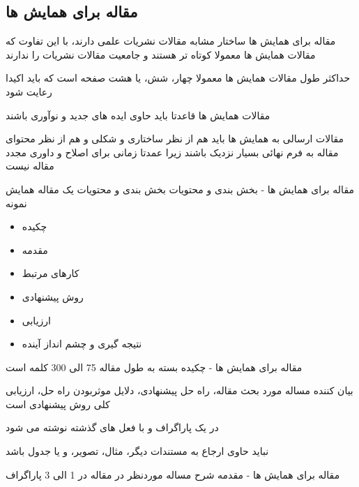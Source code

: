 \documentclass[14pt]{beamer}
\makeatletter
\newcommand{\rtlist}{\raggedleft\rightskip\@totalleftmargin}
\newcommand{\sectionfontsize}{\fontsize{22pt}{0pt}\selectfont}
\newcommand{\framefontsizelarge}{\fontsize{18pt}{0pt}\selectfont}
\newcommand{\frametitlefontsize}{\fontsize{20pt}{0pt}\selectfont}
\makeatother
\begin{document}
\begin{persian}
	\section{\sectionfontsize مقاله برای همایش ها}	

	\begin{frame}[plain]{\frametitlefontsize مقاله برای همایش ها}
		\framefontsizelarge
		ساختار مشابه مقالات نشریات علمی دارند، با این تفاوت که مقالات همایش ها معمولا کوتاه تر هستند و جامعیت مقالات نشریات را ندارند
		
		حداکثر طول مقالات همایش ها معمولا چهار، شش، یا هشت صفحه است که باید اکیدا رعایت شود
		
		مقالات همایش ها قاعدتا باید حاوی ایده های جدید و نوآوری باشند
		
		مقالات ارسالی به همایش ها باید هم از نظر ساختاری و شکلی و هم از نظر محتوای مقاله به فرم نهائی بسیار نزدیک باشند زیرا عمدتا زمانی برای اصلاح و داوری مجدد مقاله نیست
	\end{frame}	
	
	\begin{frame}[plain]{\frametitlefontsize مقاله برای همایش ها - بخش بندی و محتویات}
		\framefontsizelarge
		بخش بندی و محتویات یک مقاله همایش نمونه
		\begin{itemize}\rtlist
			\item چکیده
			\item مقدمه
			\item کارهای مرتبط
			\item روش پیشنهادی
			\item ارزیابی
			\item نتیجه گیری و چشم انداز آینده
		\end{itemize}
	\end{frame}	
	
	\begin{frame}[plain]{\frametitlefontsize مقاله برای همایش ها - چکیده}
		\framefontsizelarge
		بسته به طول مقاله 75 الی 300 کلمه است
		
		بیان کننده مساله مورد بحث مقاله، راه حل پیشنهادی، دلایل موثربودن راه حل، ارزیابی کلی روش پیشنهادی است 
		
		در یک پاراگراف و با فعل های گذشته نوشته می شود
		
		نباید حاوی ارجاع به مستندات دیگر، مثال، تصویر، و یا جدول باشد
	\end{frame}	
	
	\begin{frame}[plain]{\frametitlefontsize مقاله برای همایش ها - مقدمه}
		\framefontsizelarge
		شرح مساله موردنظر در مقاله در 1 الی 3 پاراگراف
		

\end{frame}
\end{persian}
\end{document}
